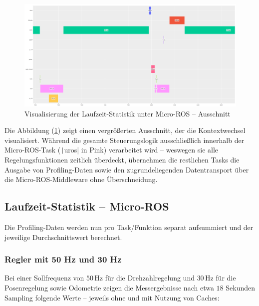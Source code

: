 \begin{figure}[h]
    \centering
    \includegraphics[width=1\textwidth]{assets/micro_ros_profiling_ausschnitt_cache_enabled}
    \caption{Visualisierung der Laufzeit-Statistik unter Micro-ROS -- Ausschnitt}
    \label{fig:profiling_ausschnitt}
\end{figure}

Die Abbildung (\ref{fig:profiling_ausschnitt}) zeigt einen vergrößerten
Ausschnitt, der die Kontextwechsel visualisiert. Während die gesamte
Steuerungslogik ausschließlich innerhalb der Micro-ROS-Task
(\texttt|uros| in Pink) verarbeitet wird -- weswegen sie alle
Regelungsfunktionen zeitlich überdeckt, übernehmen die restlichen Tasks die
Ausgabe von Profiling-Daten sowie den zugrundeliegenden Datentransport über die
Micro-ROS-Middleware ohne Überschneidung.

\subsection{Laufzeit-Statistik -- Micro-ROS}

Die Profiling-Daten werden nun pro Task/Funktion separat aufsummiert und der
jeweilige Durchschnittswert berechnet.

\subsubsection{Regler mit 50 Hz und 30 Hz}

Bei einer Sollfrequenz von $50\,\text{Hz}$ für die Drehzahlregelung und
$30\,\text{Hz}$ für die Posenregelung sowie Odometrie zeigen die Messergebnisse
nach etwa $18$ Sekunden Sampling folgende Werte -- jeweils ohne und mit Nutzung
von Caches:

